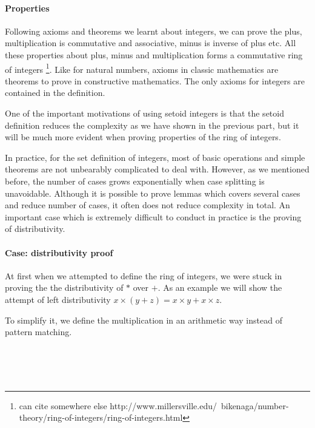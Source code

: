 \paragraph{Properties}

Following axioms and theorems we learnt about integers, we can prove
the plus, multiplication is commutative and associative, minus is
inverse of plus etc. All these properties about plus, minus and
multiplication forms a commutative ring of integers \footnote{can cite
somewhere else http://www.millersville.edu/~bikenaga/number-theory/ring-of-integers/ring-of-integers.html}.
Like for natural numbers, axioms in classic mathematics are theorems
to prove in constructive mathematics. The only axioms for integers are
contained in the definition.

One of the important motivations of using setoid integers is that
the setoid definition reduces the complexity as we have shown in the
previous part, but it
will be much more evident when proving properties of the ring of integers.

In practice, for the set definition of integers, most of basic operations and simple theorems are not unbearably
complicated to deal with. However, as we mentioned before, the number of
cases grows exponentially when case splitting is unavoidable.
Although it is
possible to prove lemmas which covers several cases and reduce number
of cases, it often does not reduce complexity in total.
 An important case which is extremely difficult to conduct in practice is the proving of distributivity.

\paragraph{Case: distributivity proof}

At first when we attempted to define the ring of integers, we were
stuck in proving the the distributivity of $*$ over $+$. As an example
we will show the attempt of left
distributivity $ x \times (y + z) = x \times y + x \times z$.

To simplify it, we define the multiplication in an arithmetic way
instead of pattern matching.

\begin{code}
\\
\> \AgdaSymbol{:}     \<%
\\
\>   \AgdaSymbol{=}
  
   
   
 \<%
\\
\end{code}


